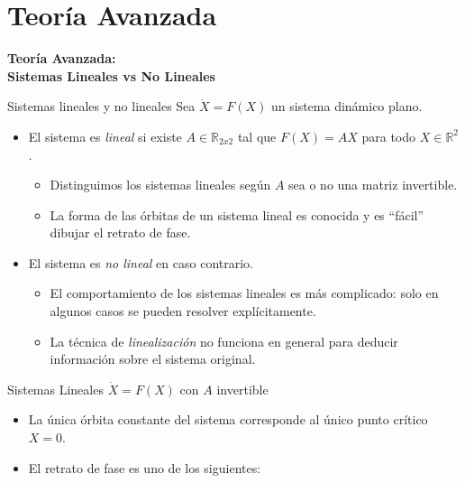 \documentclass{beamer}
\newcommand{\R}{{\ensuremath{\mathbb{R}}}}
\newcommand{\stframe}[1]{\begin{frame} \begin{center}\Large{\textbf{{#1}}}\end{center}\end{frame}}
\begin{document}
\section{Teoría Avanzada}
\stframe{Teoría Avanzada:\\Sistemas Lineales vs No Lineales}

\begin{frame}{Sistemas lineales y no lineales}
Sea $\dot{X} = F(X)$ un sistema dinámico plano.
\pause
\begin{itemize}
\item El sistema es \emph{lineal} si existe $A \in \R_{2x2}$ tal que $F(X) = AX$ para todo $X \in \R^2$. \pause
	\begin{itemize}
		\item Distinguimos los sistemas lineales según $A$ sea o no una matriz invertible.
		\pause
		\item La forma de las órbitas de un sistema lineal es conocida y es ``fácil'' dibujar el retrato de fase.
		\pause
	\end{itemize}
\item El sistema es \emph{no lineal} en caso contrario.
	\pause
	\begin{itemize}
		\item El comportamiento de los sistemas lineales es más complicado: solo en algunos casos se pueden resolver explícitamente.
		\pause
		\item La técnica de \emph{linealización} no funciona en general para deducir información sobre el sistema original.
	\end{itemize}
\end{itemize}

\end{frame}

\begin{frame}{Sistemas Lineales $\dot{X} = F(X)$ con $A$ invertible}
\begin{itemize}
 \item La única órbita constante del sistema corresponde al único punto crítico $X = 0$.
 \item El retrato de fase es uno de los siguientes:
\end{itemize}

\end{frame}
\end{document}
